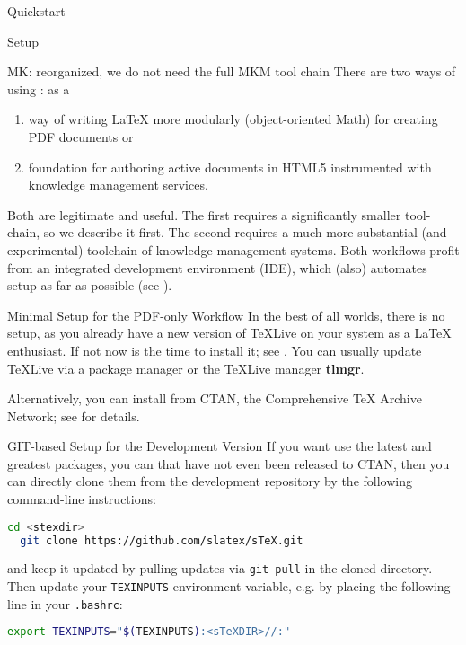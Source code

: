 \begin{sfragment}{Quickstart}
  
  \begin{sfragment}{Setup}
    \begin{newpart}{MK: reorganized, we do not need the full MKM tool chain}
      There are two ways of using \sTeX: as a 
      \begin{enumerate}
      \item way of writing {\LaTeX} more modularly (object-oriented Math) for creating PDF
        documents or
      \item foundation for authoring active documents in HTML5 instrumented with knowledge
        management services. 
      \end{enumerate}
      Both are legitimate and useful. The first requires a significantly smaller
      tool-chain, so we describe it first. The second requires a much more substantial
      (and experimental) toolchain of knowledge management systems. Both workflows profit
      from an integrated development environment (IDE), which (also) automates setup as
      far as possible (see ). 

      \begin{sfragment}[id=sec.minimal-setup]{Minimal Setup for the PDF-only Workflow}
        In the best of all worlds, there is no setup, as you already have a new version of
        {\TeX}Live on your system as a {\LaTeX} enthusiast. If not now is the time to
        install it; see \cite{TeXLive:on}. You can usually update {\TeX}Live via a package
        manager or the {\TeX}Live manager \textbf{tlmgr}.

        Alternatively, you can install \sTeX from CTAN, the Comprehensive {\TeX} Archive
        Network; see \cite{stexCTAN:on} for details.
      \end{sfragment}

      \begin{sfragment}[id=sec.git-setup]{GIT-based Setup for the \sTeX Development Version}
        If you want use the latest and greatest \sTeX packages, you can that have not even
        been released to CTAN, then you can directly clone them from the \sTeX development
        repository \cite{sTeX:github:on} by the following command-line instructions: 
\begin{lstlisting}[language=bash]
  cd <stexdir>
  git clone https://github.com/slatex/sTeX.git
\end{lstlisting}
       and keep it updated by pulling updates via \lstinline|git pull| in the cloned \sTeX
       directory.
       Then update your \lstinline|TEXINPUTS| environment variable, e.g. by placing the following line in your \lstinline|.bashrc|:
\begin{lstlisting}[language=bash]
export TEXINPUTS="$(TEXINPUTS):<sTeXDIR>//:"
\end{lstlisting}       
      \end{sfragment}


\end{newpart}
\end{sfragment}
\end{sfragment}
